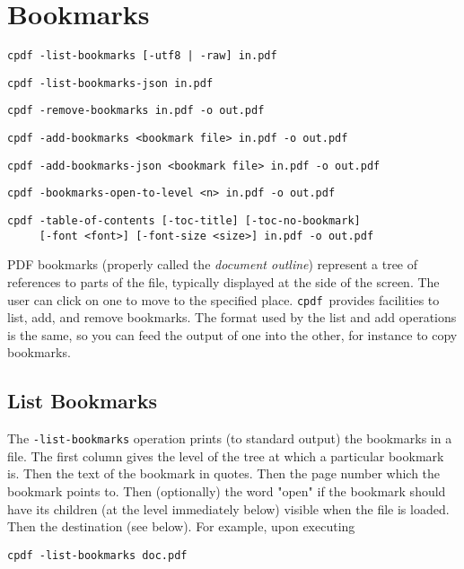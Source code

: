 \documentclass{book}
\newcommand{\cpdf}{\texttt{cpdf}}
\begin{document}
\chapter{Bookmarks}\label{chap:6}
  \begin{framed}
  \small\noindent\verb!cpdf -list-bookmarks [-utf8 | -raw] in.pdf!

  \vspace{1.5mm}
  \small\noindent\verb!cpdf -list-bookmarks-json in.pdf!

  \vspace{1.5mm}
  \small\noindent\verb!cpdf -remove-bookmarks in.pdf -o out.pdf!

  \vspace{1.5mm}
  \small\noindent\verb!cpdf -add-bookmarks <bookmark file> in.pdf -o out.pdf!

  \vspace{1.5mm}
  \small\noindent\verb!cpdf -add-bookmarks-json <bookmark file> in.pdf -o out.pdf!

  \vspace{1.5mm}
  \small\noindent\verb!cpdf -bookmarks-open-to-level <n> in.pdf -o out.pdf!

  \vspace{1.5mm}
  \small\noindent\verb!cpdf -table-of-contents [-toc-title] [-toc-no-bookmark]!\\
  \small\noindent\verb!     [-font <font>] [-font-size <size>] in.pdf -o out.pdf!

  \end{framed}
  PDF bookmarks (properly called the \textit{document outline}) represent a tree
of references to parts of the file, typically displayed at the side of the
screen. The user can click on one to move to the specified place. \cpdf\ provides
facilities to list, add, and remove bookmarks. The format used by the list and
add operations is the same, so you can feed the output of one into the other,
for instance to copy bookmarks.

  \section{List Bookmarks}
  The \texttt{-list-bookmarks} operation prints (to standard output) the
bookmarks in a file. The first column gives the level of the tree at which a
particular bookmark is. Then the text of the bookmark in quotes. Then the page
number which the bookmark points to. Then (optionally) the word "open" if the
bookmark should have its children (at the level immediately below) visible when
the file is loaded. Then the destination (see below). For example, upon executing
\begin{framed}
  \small\verb!cpdf -list-bookmarks doc.pdf!
\end{framed}
\end{document}
